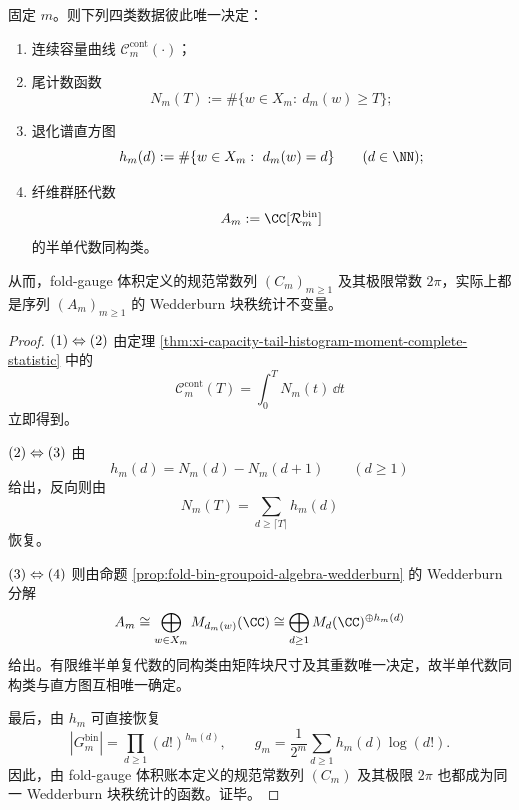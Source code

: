 \begin{theorem}\label{thm:conclusion-wedderburn-threshold-holography}
固定 \(m\)。则下列四类数据彼此唯一决定：
\begin{enumerate}
  \item 连续容量曲线 \(\mathcal C_m^{\mathrm{cont}}(\cdot)\)；
  \item 尾计数函数
  \[
  N_m(T):=\#\{w\in X_m:\ d_m(w)\ge T\};
  \]
  \item 退化谱直方图
  \[
  h_m(d):=\#\{w\in X_m:\ d_m(w)=d\}
  \qquad(d\in\NN);
  \]
  \item 纤维群胚代数
  \[
  A_m:=\CC[\mathcal R_m^{\mathrm{bin}}]
  \]
  的半单代数同构类。
\end{enumerate}
从而，fold-gauge 体积定义的规范常数列 \((C_m)_{m\ge 1}\) 及其极限常数 \(2\pi\)，实际上都是序列 \((A_m)_{m\ge 1}\) 的 Wedderburn 块秩统计不变量。
\end{theorem}
\begin{proof}
\(\textup{(1)}\Leftrightarrow\textup{(2)}\) 由定理 \ref{thm:xi-capacity-tail-histogram-moment-complete-statistic} 中的
\[
\mathcal C_m^{\mathrm{cont}}(T)=\int_0^T N_m(t)\,\dd t
\]
立即得到。

\(\textup{(2)}\Leftrightarrow\textup{(3)}\) 由
\[
h_m(d)=N_m(d)-N_m(d+1)
\qquad(d\ge 1)
\]
给出，反向则由
\[
N_m(T)=\sum_{d\ge \lceil T\rceil}h_m(d)
\]
恢复。

\(\textup{(3)}\Leftrightarrow\textup{(4)}\) 则由命题 \ref{prop:fold-bin-groupoid-algebra-wedderburn} 的 Wedderburn 分解
\[
A_m
\cong
\bigoplus_{w\in X_m}M_{d_m(w)}(\CC)
\cong
\bigoplus_{d\ge 1}M_d(\CC)^{\oplus h_m(d)}
\]
给出。有限维半单复代数的同构类由矩阵块尺寸及其重数唯一决定，故半单代数同构类与直方图互相唯一确定。

最后，由 \(h_m\) 可直接恢复
\[
|G_m^{\mathrm{bin}}|
=
\prod_{d\ge 1}(d!)^{h_m(d)},
\qquad
g_m
=
\frac{1}{2^m}\sum_{d\ge 1}h_m(d)\log(d!).
\]
因此，由 fold-gauge 体积账本定义的规范常数列 \((C_m)\) 及其极限 \(2\pi\) 也都成为同一 Wedderburn 块秩统计的函数。证毕。
\end{proof}

